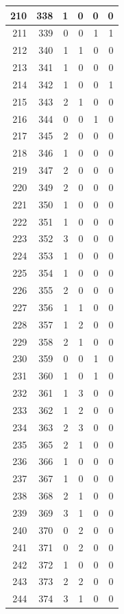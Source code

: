 \documentclass[
  letterpaper,
  DIV=11,
  numbers=noendperiod]{scrreprt}
\begin{document}
\begin{tabular}{r|r|r|r|r|r}
\hline
210 & 338 & 1 & 0 & 0 & 0\\
\hline
211 & 339 & 0 & 0 & 1 & 1\\
\hline
212 & 340 & 1 & 1 & 0 & 0\\
\hline
213 & 341 & 1 & 0 & 0 & 0\\
\hline
214 & 342 & 1 & 0 & 0 & 1\\
\hline
215 & 343 & 2 & 1 & 0 & 0\\
\hline
216 & 344 & 0 & 0 & 1 & 0\\
\hline
217 & 345 & 2 & 0 & 0 & 0\\
\hline
218 & 346 & 1 & 0 & 0 & 0\\
\hline
219 & 347 & 2 & 0 & 0 & 0\\
\hline
220 & 349 & 2 & 0 & 0 & 0\\
\hline
221 & 350 & 1 & 0 & 0 & 0\\
\hline
222 & 351 & 1 & 0 & 0 & 0\\
\hline
223 & 352 & 3 & 0 & 0 & 0\\
\hline
224 & 353 & 1 & 0 & 0 & 0\\
\hline
225 & 354 & 1 & 0 & 0 & 0\\
\hline
226 & 355 & 2 & 0 & 0 & 0\\
\hline
227 & 356 & 1 & 1 & 0 & 0\\
\hline
228 & 357 & 1 & 2 & 0 & 0\\
\hline
229 & 358 & 2 & 1 & 0 & 0\\
\hline
230 & 359 & 0 & 0 & 1 & 0\\
\hline
231 & 360 & 1 & 0 & 1 & 0\\
\hline
232 & 361 & 1 & 3 & 0 & 0\\
\hline
233 & 362 & 1 & 2 & 0 & 0\\
\hline
234 & 363 & 2 & 3 & 0 & 0\\
\hline
235 & 365 & 2 & 1 & 0 & 0\\
\hline
236 & 366 & 1 & 0 & 0 & 0\\
\hline
237 & 367 & 1 & 0 & 0 & 0\\
\hline
238 & 368 & 2 & 1 & 0 & 0\\
\hline
239 & 369 & 3 & 1 & 0 & 0\\
\hline
240 & 370 & 0 & 2 & 0 & 0\\
\hline
241 & 371 & 0 & 2 & 0 & 0\\
\hline
242 & 372 & 1 & 0 & 0 & 0\\
\hline
243 & 373 & 2 & 2 & 0 & 0\\
\hline
244 & 374 & 3 & 1 & 0 & 0\\

\end{tabular}
\end{document}
